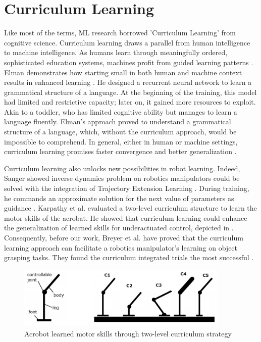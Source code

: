 \chapter{Curriculum Learning}

Like most of the terms, ML research borrowed 'Curriculum Learning' from cognitive science. Curriculum learning draws a parallel from human intelligence to machine intelligence. As humans learn through meaningfully ordered, sophisticated education systems, machines profit from guided learning patterns \cite{Bengio2009}. Elman demonstrates how starting small in both human and machine context results in enhanced learning \cite{Elman1993}. He designed a recurrent neural network to learn a grammatical structure of a language. At the beginning of the training, this model had limited and restrictive capacity; later on, it gained more resources to exploit. Akin to a toddler, who has limited cognitive ability but manages to learn a language fluently. Elman's approach proved to understand a grammatical structure of a language, which, without the curriculum approach, would be impossible to comprehend. In general, either in human or machine settings, curriculum learning promises faster convergence and better generalization \cite{Bengio2009}. 

Curriculum learning also unlocks new possibilities in robot learning. Indeed, Sanger showed inverse dynamics problem on robotics manipulators could be solved with the integration of Trajectory Extension Learning \cite{Sanger1994}. During training, he commands an approximate solution for the next value of parameters as guidance \cite{Sanger1994}. Karpathy et al. evaluated a two-level curriculum structure to learn the motor skills of the acrobat. He showed that curriculum learning could enhance the generalization of learned skills for underactuated control, depicted in \cite{Karpathy2012}. Consequently, before our work, Breyer et al. have proved that the curriculum learning approach can facilitate a robotics manipulator's learning on object grasping tasks. They found the curriculum integrated trials the most successful \cite{Breyer2018}.

\begin{figure}[htbp]
    \centering
      \includegraphics[width=0.9\textwidth]{figures/acrobot}
    \caption{Acrobot learned motor skills through two-level curriculum strategy \cite{Karpathy2012}}
    \label{fig:curriculum}
\end{figure}

